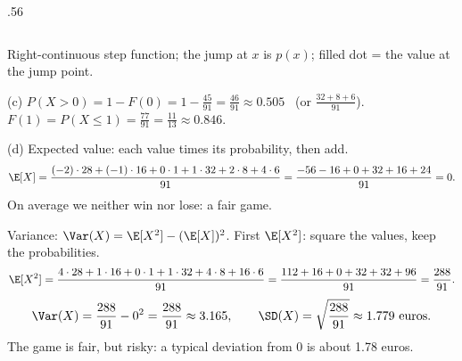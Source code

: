 \begin{slides}
\begin{columns}[T]
\begin{column}{.56\textwidth}
		\end{column}
	\end{columns}
	\smallskip
	Right-continuous step function; the jump at $x$ is $p(x)$; filled dot = the
	value at the jump point.
	\pause
	\smallskip

	(c) $P(X>0)=1-F(0)=1-\frac{45}{91}=\frac{46}{91}\approx0.505$
	\ (or $\frac{32+8+6}{91}$).\\
	\phantom{(c) }$F(1)=P(X\le1)=\frac{77}{91}=\frac{11}{13}\approx0.846$.
\end{slides}

\begin{slides}
	\small
	(d) Expected value: each value times its probability, then add.
	\[ \E[X]=\frac{(-2)\cdot28+(-1)\cdot16+0\cdot1+1\cdot32+2\cdot8+4\cdot6}{91}
		=\frac{-56-16+0+32+16+24}{91}=0. \]
	On average we neither win nor lose: a \alert{fair game}.
	\pause
	\medskip

	Variance: $\Var(X)=\E[X^2]-(\E[X])^2$. First $\E[X^2]$: square the values,
	keep the probabilities.
	\[ \E[X^2]=\frac{4\cdot28+1\cdot16+0\cdot1+1\cdot32+4\cdot8+16\cdot6}{91}
		=\frac{112+16+0+32+32+96}{91}=\frac{288}{91}. \]
	\pause
	\[ \Var(X)=\frac{288}{91}-0^2=\frac{288}{91}\approx3.165, \qquad
		\SD(X)=\sqrt{\frac{288}{91}}\approx1.779 \text{ euros}. \]
	\pause
	The game is fair, but risky: a typical deviation from 0 is about
	1.78 euros.
\end{slides}

